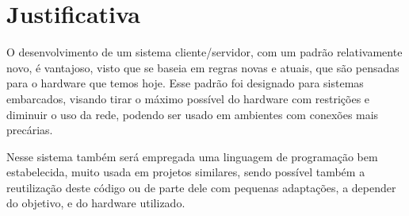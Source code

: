 \section{Justificativa}

O desenvolvimento de um sistema cliente/servidor, com um padrão relativamente novo, é vantajoso, visto que se baseia em regras novas e atuais, que são pensadas para o hardware que temos hoje. Esse padrão foi designado para sistemas embarcados, visando tirar o máximo possível do hardware com restrições e diminuir o uso da rede, podendo ser usado em ambientes com conexões mais precárias.

Nesse sistema também será empregada uma linguagem de programação bem estabelecida, muito usada em projetos similares, sendo possível também a reutilização deste código ou de parte dele com pequenas adaptações, a depender do objetivo, e do hardware utilizado.